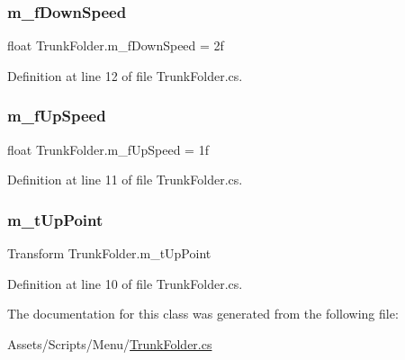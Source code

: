 \subsubsection{\texorpdfstring{m\+\_\+f\+Down\+Speed}{m\_fDownSpeed}}
{\footnotesize\ttfamily float Trunk\+Folder.\+m\+\_\+f\+Down\+Speed = 2f}



Definition at line 12 of file Trunk\+Folder.\+cs.

\mbox{\label{class_trunk_folder_adb52bbeab0b159bd7f5eda7c7d2b55d9}} 
\subsubsection{\texorpdfstring{m\+\_\+f\+Up\+Speed}{m\_fUpSpeed}}
{\footnotesize\ttfamily float Trunk\+Folder.\+m\+\_\+f\+Up\+Speed = 1f}



Definition at line 11 of file Trunk\+Folder.\+cs.

\mbox{\label{class_trunk_folder_adad3381047ee490b2b5c36548a00380e}} 
\subsubsection{\texorpdfstring{m\+\_\+t\+Up\+Point}{m\_tUpPoint}}
{\footnotesize\ttfamily Transform Trunk\+Folder.\+m\+\_\+t\+Up\+Point}



Definition at line 10 of file Trunk\+Folder.\+cs.



The documentation for this class was generated from the following file\+:\begin{DoxyCompactItemize}
\item 
Assets/\+Scripts/\+Menu/\mbox{\hyperlink{_trunk_folder_8cs}{Trunk\+Folder.\+cs}}\end{DoxyCompactItemize}
